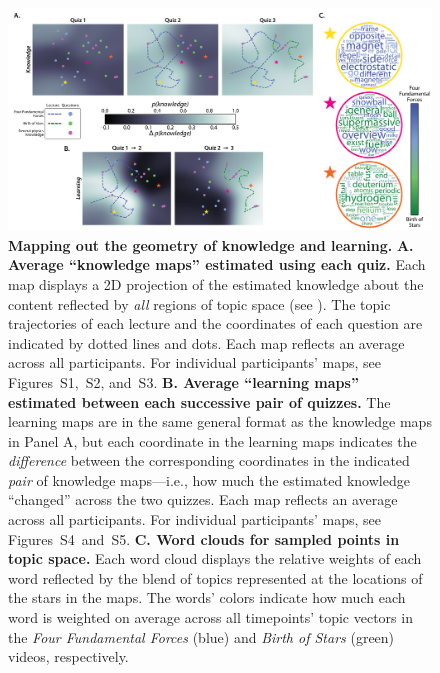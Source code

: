 \documentclass[10pt]{article}
\newcommand{\individualKnowledgeMapsA}{S1}
\newcommand{\individualKnowledgeMapsB}{S2}
\newcommand{\individualKnowledgeMapsC}{S3}
\newcommand{\individualLearningMapsA}{S4}
\newcommand{\individualLearningMapsB}{S5}
\renewcommand{\nameref}[1]{\mbox{\textit{\oldnameref{#1}}}}
\begin{document}
\begin{figure}[tp]
    \centering
    \includegraphics[width=\textwidth]{figs/knowledge_and_learning_maps}

    \caption{\textbf{Mapping out the geometry of knowledge and learning.}
    \textbf{A. Average ``knowledge maps'' estimated using each quiz.} Each map
    displays a 2D projection of the estimated knowledge about the content
    reflected by \textit{all} regions of topic space (see
    \nameref{subsec:knowledge-maps}). The topic trajectories of each
    lecture and the coordinates of each question are indicated by dotted lines
    and dots. Each map reflects an average across all participants. For
    individual participants' maps, see
    Figures~\individualKnowledgeMapsA,~\individualKnowledgeMapsB,
    and~\individualKnowledgeMapsC. \textbf{B. Average ``learning maps''
    estimated between each successive pair of quizzes.} The learning maps are
    in the same general format as the knowledge maps in Panel A, but each
    coordinate in the learning maps indicates the \textit{difference} between
    the corresponding coordinates in the indicated \textit{pair} of knowledge
    maps---i.e., how much the estimated knowledge ``changed'' across the two
    quizzes. Each map reflects an average across all participants. For
    individual participants' maps, see
    Figures~\individualLearningMapsA~and~\individualLearningMapsB. \textbf{C.
    Word clouds for sampled points in topic space.} Each word cloud displays
    the relative weights of each word reflected by the blend of topics
    represented at the locations of the stars in the maps. The words' colors
    indicate how much each word is weighted on average across all timepoints'
    topic vectors in the \textit{Four Fundamental Forces} (blue) and
    \textit{Birth of Stars} (green) videos, respectively.}

    \label{fig:knowledge-maps}
    \end{figure}
\end{document}

